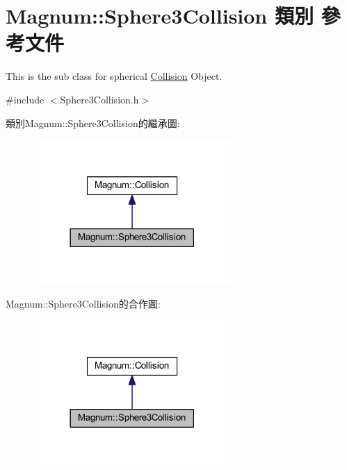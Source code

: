 \hypertarget{class_magnum_1_1_sphere3_collision}{}\section{Magnum\+:\+:Sphere3\+Collision 類別 參考文件}
\label{class_magnum_1_1_sphere3_collision}


This is the sub class for spherical \hyperlink{class_magnum_1_1_collision}{Collision} Object.  




{\ttfamily \#include $<$Sphere3\+Collision.\+h$>$}



類別\+Magnum\+:\+:Sphere3\+Collision的繼承圖\+:\nopagebreak
\begin{figure}[H]
\begin{center}
\leavevmode
\includegraphics[width=213pt]{class_magnum_1_1_sphere3_collision__inherit__graph}
\end{center}
\end{figure}


Magnum\+:\+:Sphere3\+Collision的合作圖\+:\nopagebreak
\begin{figure}[H]
\begin{center}
\leavevmode
\includegraphics[width=213pt]{class_magnum_1_1_sphere3_collision__coll__graph}
\end{center}
\end{figure}

